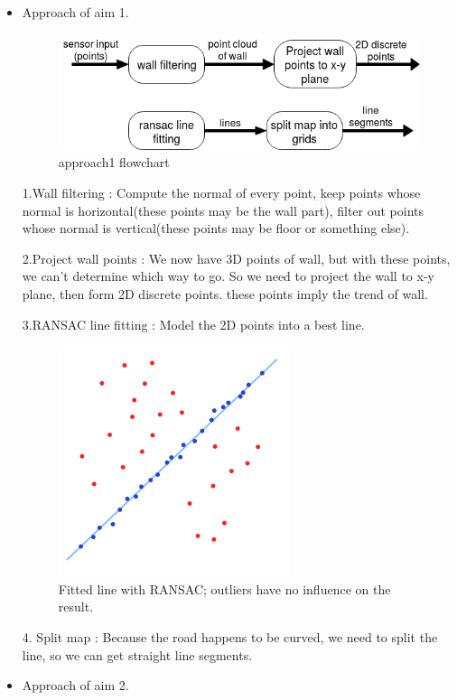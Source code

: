 \documentclass[letterpaper, 10 pt, conference]{ieeeconf}  %
\begin{document}
\begin{itemize}

\item Approach of aim 1.

\begin{figure}[h] %
\includegraphics[width=1.0\columnwidth]{approach1.png}
\centering
\caption{approach1 flowchart}
\end{figure}
1.Wall filtering : Compute the normal of every point, keep points whose normal is horizontal(these points may be the wall part), filter out points whose normal is vertical(these points may be floor or something else).

2.Project wall points : We now have 3D points of wall, but with these points, we can't determine which way to go. So we need to project the wall to x-y plane, then form 2D discrete points. these points imply the trend of wall.  

3.RANSAC line fitting : Model the 2D points into a best line.
\begin{figure}[h] %
\includegraphics[width=0.5\columnwidth]{RANSAC.png}
\centering
\caption{Fitted line with RANSAC; outliers have no influence on the result.}
\end{figure}

4. Split map : Because the road happens to be curved, we need to split the line, so we can get straight line segments.

\item Approach of aim 2.


\end{itemize}
\end{document}
